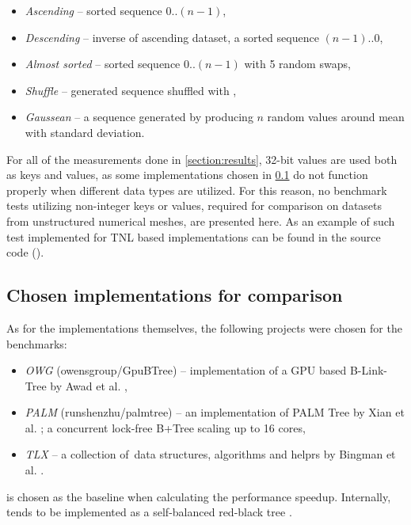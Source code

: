\begin{itemize}
  \item \textit{Ascending} -- sorted sequence $0..(n-1)$,
  \item \textit{Descending} -- inverse of ascending dataset, a sorted sequence $(n-1)..0$,
  \item \textit{Almost sorted} -- sorted sequence $0..(n-1)$ with 5 random swaps,
  \item \textit{Shuffle} -- generated sequence shuffled with ,
  \item \textit{Gaussean} -- a sequence generated by producing $n$ random values around mean with standard deviation.
\end{itemize}

For all of the measurements done in \cref{section:results}, 32-bit values are used both as keys and values, as some implementations chosen in \cref{subsection:benchmark:implementations} do not function properly when different data types are utilized. For this reason, no benchmark tests utilizing non-integer keys or values, required for comparison on datasets from unstructured numerical meshes, are presented here. As an example of such test implemented for TNL based implementations can be found in the source code ().

\subsection{Chosen implementations for comparison}\label{subsection:benchmark:implementations}

As for the implementations themselves, the following projects were chosen for the benchmarks:

\begin{itemize}
  \item \textit{OWG} (owensgroup/GpuBTree) -- implementation of a GPU based B-Link-Tree by Awad et al. \cite{awad},
  \item \textit{PALM} (runshenzhu/palmtree) -- an implementation of PALM Tree \cite{palm} by Xian et al. \cite{palm-impl}; a concurrent lock-free B+Tree scaling up to 16 cores,
  \item \textit{TLX} -- a collection of \CC\,data structures, algorithms and helprs by Bingman et al. \cite{TLX}.
\end{itemize}

 is chosen as the baseline when calculating the performance speedup. Internally,  tends to be implemented as a self-balanced red-black tree \cite{cppreference-map}.


